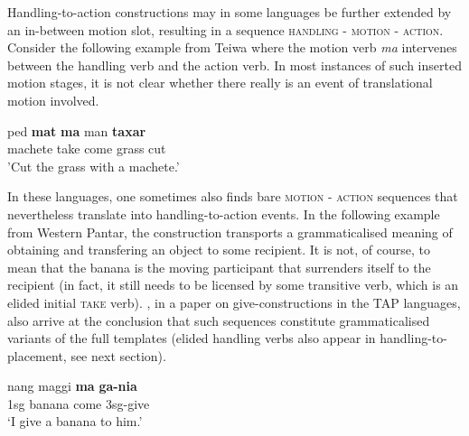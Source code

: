 Handling-to-action constructions may in some languages be further extended by an in-between motion slot, resulting in a sequence \textsc{handling - motion - action}. Consider the following example from Teiwa where the motion verb \textit{ma} intervenes between the handling verb and the action verb. In most instances of such inserted motion stages, it is not clear whether there really is an event of translational motion involved.

\ea \label{}
\gll ped \textbf{mat} \textbf{ma} man \textbf{taxar} \\
machete take come grass cut \\
\glft 'Cut the grass with a machete.' \\ 
\z
\xe

In these languages, one sometimes also finds bare \textsc{motion - action} sequences that nevertheless translate into handling-to-action events. In the following example from Western Pantar, the construction transports a grammaticalised meaning of obtaining and transfering an object to some recipient. It is not, of course, to mean that the banana is the moving participant that surrenders itself to the recipient (in fact, it still needs to be licensed by some transitive verb, which is an elided initial \textsc{take} verb). \textcite{klamer2012development}, in a paper on give-constructions in the TAP languages, also arrive at the conclusion that such sequences constitute grammaticalised variants of the full templates (elided handling verbs also appear in handling-to-placement, see next section).

\ea \label{}
\gll nang maggi \textbf{ma} \textbf{ga-nia} \\
\acs{1}\acs{sg} banana come \acs{3}\acs{sg}-give \\
\glft ‘I give a banana to him.’ \\ 
\z
\xe

